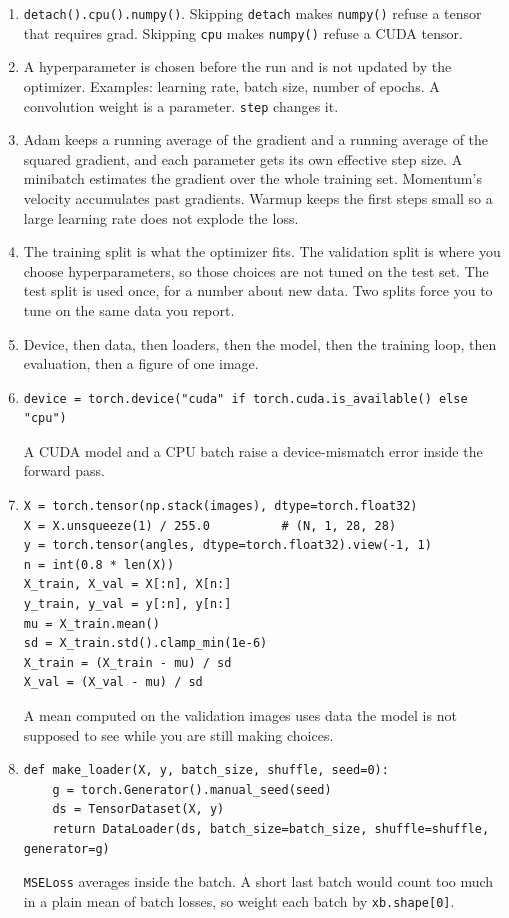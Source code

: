 \documentclass[11pt]{article}
\begin{document}
\begin{enumerate}
\item \texttt{detach().cpu().numpy()}. Skipping \texttt{detach} makes \texttt{numpy()} refuse a tensor that requires grad. Skipping \texttt{cpu} makes \texttt{numpy()} refuse a CUDA tensor.

\item A hyperparameter is chosen before the run and is not updated by the optimizer. Examples: learning rate, batch size, number of epochs. A convolution weight is a parameter. \texttt{step} changes it.

\item Adam keeps a running average of the gradient and a running average of the squared gradient, and each parameter gets its own effective step size. A minibatch estimates the gradient over the whole training set. Momentum's velocity accumulates past gradients. Warmup keeps the first steps small so a large learning rate does not explode the loss.

\item The training split is what the optimizer fits. The validation split is where you choose hyperparameters, so those choices are not tuned on the test set. The test split is used once, for a number about new data. Two splits force you to tune on the same data you report.

\item Device, then data, then loaders, then the model, then the training loop, then evaluation, then a figure of one image.

\item
\begin{verbatim}
device = torch.device("cuda" if torch.cuda.is_available() else "cpu")
\end{verbatim}
A CUDA model and a CPU batch raise a device-mismatch error inside the forward pass.

\item
\begin{verbatim}
X = torch.tensor(np.stack(images), dtype=torch.float32)
X = X.unsqueeze(1) / 255.0          # (N, 1, 28, 28)
y = torch.tensor(angles, dtype=torch.float32).view(-1, 1)
n = int(0.8 * len(X))
X_train, X_val = X[:n], X[n:]
y_train, y_val = y[:n], y[n:]
mu = X_train.mean()
sd = X_train.std().clamp_min(1e-6)
X_train = (X_train - mu) / sd
X_val = (X_val - mu) / sd
\end{verbatim}
A mean computed on the validation images uses data the model is not supposed to see while you are still making choices.

\item
\begin{verbatim}
def make_loader(X, y, batch_size, shuffle, seed=0):
    g = torch.Generator().manual_seed(seed)
    ds = TensorDataset(X, y)
    return DataLoader(ds, batch_size=batch_size, shuffle=shuffle, generator=g)
\end{verbatim}
\texttt{MSELoss} averages inside the batch. A short last batch would count too much in a plain mean of batch losses, so weight each batch by \texttt{xb.shape[0]}.


\end{enumerate}
\end{document}

